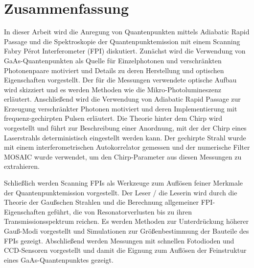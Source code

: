 
\chapter*{Zusammenfassung}
\label{cha:zusammenfassung}


In dieser Arbeit wird die Anregung von Quantenpunkten mittels Adiabatic Rapid Passage und die Spektroskopie der Quantenpunktemission mit einem Scanning Fabry Pérot Interferometer (FPI) diskutiert.
Zunächst wird die Verwendung von GaAs-Quantenpunkten als Quelle für Einzelphotonen und verschränkten Photonenpaare motiviert und Details zu deren Herstellung und optischen Eigenschaften vorgestellt.
Der für die Messungen verwendete optische Aufbau wird skizziert und es werden Methoden wie die Mikro-Photolumineszenz erläutert.
Anschließend wird die Verwendung von Adiabatic Rapid Passage zur Erzeugung verschränkter Photonen motiviert und deren Implementierung mit frequenz-gechirpten Pulsen erläutert.
Die Theorie hinter dem Chirp wird vorgestellt und führt zur Beschreibung einer Anordnung, mit der der Chirp eines Laserstrahls deterministisch eingestellt werden kann.
Der gechirpte Strahl wurde mit einem interferometrischen Autokorrelator gemessen und der numerische Filter MOSAIC wurde verwendet, um den Chirp-Parameter aus diesen Messungen zu extrahieren.

Schließlich werden Scanning FPIs als Werkzeuge zum Auflösen feiner Merkmale der Quantenpunktemission vorgestellt.
Der Leser / die Leserin wird durch die Theorie der Gaußschen Strahlen und die Berechnung allgemeiner FPI-Eigenschaften geführt, die von Resonatorverlusten bis zu ihren Transmissionsspektrum reichen.
Es werden Methoden zur Unterdrückung höherer Gauß-Modi vorgestellt und Simulationen zur Größenbestimmung der Bauteile des FPIs gezeigt.
Abschließend werden Messungen mit schnellen Fotodioden und CCD-Sensoren vorgestellt und damit die Eignung zum Auflösen der Feinstruktur eines GaAs-Quantenpunktes gezeigt.

